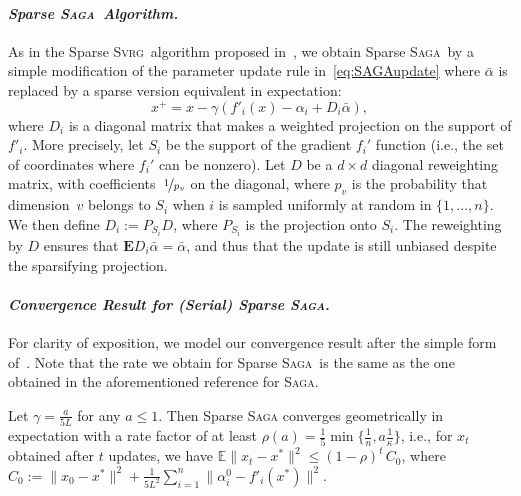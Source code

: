 \documentclass[twoside, 11pt]{article}
\newcommand{\stepsize}{\gamma}
\newcommand{\lipschitz}{L}
\newcommand{\E}{\mathbb{E}}
\newcommand{\Econd}{\mathbf{E}}
\newcommand{\SAGA}{\textsc{Saga}}
\newcommand{\SVRG}{\textsc{Svrg}}
\begin{document}
\paragraph{\textit{Sparse \SAGA\ Algorithm.}}
As in the Sparse \SVRG\ algorithm proposed in~\citet{mania}, we obtain Sparse \SAGA\ by a simple modification of the parameter update rule in~\eqref{eq:SAGAupdate} where $\bar{\alpha}$ is replaced by a sparse version equivalent in expectation:
\begin{equation} \label{eq:SparseSAGA}
x^{+} = x - \stepsize (f'_i(x) - \alpha_i + D_i \bar \alpha),
\end{equation}
where $D_i$ is a diagonal matrix that makes a weighted projection on the support of $f'_i$.
More precisely, let $S_i$ be the support of the gradient $f_i'$ function (i.e., the set of coordinates where $f_i'$ can be nonzero). Let $D$ be a $d\times d$ diagonal reweighting matrix, with coefficients~$\nicefrac{1}{p_v}$ on the diagonal, where $p_v$ is the probability that dimension~$v$ belongs to $S_i$ when $i$ is sampled uniformly at random in $\{1,...,n\}$.
We then define $D_i := P_{S_i} D$, where $P_{S_i}$ is the projection onto $S_i$.
The reweighting by $D$ ensures that $\Econd D_i \bar \alpha = \bar{\alpha}$, and thus that the update is still unbiased despite the sparsifying projection.

\paragraph{\textit{Convergence Result for (Serial) Sparse \SAGA.}}
For clarity of exposition, we model our convergence result after the simple form of~\citet[Corollary~3]{qsaga}. Note that the rate we obtain for Sparse \SAGA\ is the same as the one obtained in the aforementioned reference for \SAGA.

\begin{theorem}\label{th1}
Let $\stepsize = \frac{a}{5\lipschitz}$ for any $a\leq1$.
Then \textnormal{Sparse \SAGA} converges geometrically in expectation with a rate factor of at least $\rho(a) = \frac{1}{5} \min\big\{\frac{1}{n}, a\frac{1}{\kappa}\big\}$, i.e., for $x_t$ obtained after $t$ updates, we have $\E \|x_t - x^*\|^2 \leq {(1-\rho)}^t \,  C_0$, where $C_0 := \|x_0 - x^*\|^2 + \frac{1}{5L^2} \sum_{i=1}^n\|\alpha_i^0 - f'_i(x^*)\|^2$.
\end{theorem}
\end{document}
